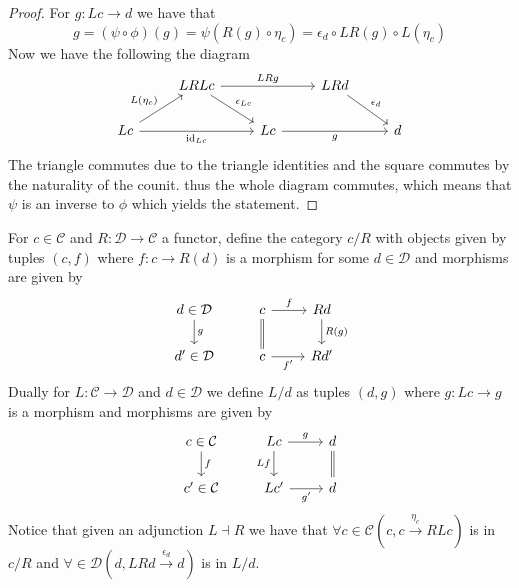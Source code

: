 \begin{proof}
    For $g \colon Lc \to d$ we have that 
    \[
        g=(\psi\circ\phi)(g) = \psi(R(g) \circ \eta_c) = \epsilon_d \circ LR(g) \circ L(\eta_c)
    \]
    Now we have the following the diagram
    \[
    \begin{tikzcd}
        &
        LRLc
        \arrow[rd, "\epsilon_{Lc}"]
        \arrow[rr, "LRg"]
        &
        &
        LRd
        \arrow[rd, "\epsilon_d"]
        \\
        Lc 
        \arrow[ru,"L(\eta_c)"]
        \arrow[rr,"\id_{Lc}"']
        &
        &
        Lc 
        \arrow[rr,"g"']
        &
        &
        d
    \end{tikzcd}
    \]
    The triangle commutes due to the triangle identities and the square commutes by the naturality of the counit. thus the whole diagram commutes, which means that $\psi$ is an inverse to $\phi$ which yields the statement.    
\end{proof}

\begin{defi}
    For $c \in \mathcal{C}$ and $R\colon \mathcal{D}\to\mathcal{C}$ a functor, define the category $c/R$ with objects given by tuples $(c,f)$
    where $f\colon c \to R(d)$ is a morphism for some $d\in \mathcal{D}$ and morphisms are given by 
    \[
    \begin{tikzcd}
        d \in \mathcal{D} 
        \arrow[d,"g"]
        &
        c
        \arrow[r,"f"]
        \arrow[d, equal]
        &
        Rd
        \arrow[d,"R(g)"]
        \\
        d' \in \mathcal{D}
        &
        c
        \arrow[r,"f'"']
        &
        Rd'
    \end{tikzcd}
    \]
    Dually for $L \colon \mathcal{C} \to \mathcal{D}$ and $d \in \mathcal{D}$ we define $L/d$ as tuples $(d,g)$ where $g\colon Lc \to g$ is a morphism and morphisms are given by 
    \[
    \begin{tikzcd}
        c \in \mathcal{C} 
        \arrow[d,"f"]
        &
        Lc
        \arrow[r,"g"]
        \arrow[d, "Lf"']
        &
        d
        \arrow[d, equal]
        \\
        c' \in \mathcal{C}
        &
        Lc'
        \arrow[r,"g'"']
        &
        d
    \end{tikzcd}
    \]
    Notice that given an adjunction $ L \dashv R$ we have that $\forall c \in \mathcal{C} (c,c \xrightarrow{\eta_c} RLc)$ is in $c/R$ and $\forall \in \mathcal{D}(d, LRd \xrightarrow{\epsilon_d} d)$ is in $L/d$.
\end{defi}

